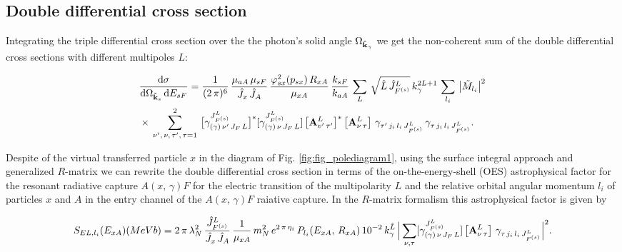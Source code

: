 \documentclass[prl,unsortedaddress,groupedaddress,twocolumn,amsmath,amsfonts,amssymb,showpacs,floatfix,nofootinbib]{revtex4}
\begin{document}
\subsection{Double differential cross section}
Integrating the triple differential cross section over the the photon's solid angle ${\Omega}_{{\rm {\bf {\hat k}}}_{\gamma}}$ we get the non-coherent sum of the double differential cross sections with different multipoles $L$:
\begin{widetext}
\begin{align}
&\frac{ {\rm d}\sigma}{  {\rm d}{\Omega}_{  {\rm{\bf {\hat k}}}_{s} }\, {\rm d}{E_{sF}} }=
 \frac{1}{(2\,\pi)^{6} }\,\frac{\mu_{aA}\,\mu_{sF}}{{\hat J}_{x}\,{\hat J}_{A}} \,\frac{\varphi_{sx}^{2}(p_{sx})\,R_{xA}}{\mu_{xA}}\,\frac{ k_{sF}}{k_{aA}}\,
 \sum\limits_{L}\,\sqrt{{\hat L}\,{\hat J}_{F^{(s)}}^{L}}\,k_{\gamma}^{2L+1}\,\sum\limits_{l_{i}}\,\big| {\tilde M}_{l_{i}}\big|^{2}                                  \nonumber\\
& \times\,\sum\limits_{\nu', \,\nu,\,\tau',\, \tau=1}^{2}\,\big[\gamma_{ (\gamma)\,\nu'\,J_{F}\,L}^{J_{F^{(s)}}^{L}}  \big]^{*} [\gamma_{(\gamma)\,\nu\,J_{F}\,L}^{J_{F^{(s)}}^{L}} ]\,\big[{\bf A}_{v'\,\tau'}^{L} \big]^{*}\,\big[{\bf A}_{\nu\,\tau}^{L} \big]\ \gamma_{\tau'\,j_{i}\,l_{i}\,J_{F^{(s)}}^{L}}\,\gamma_{\tau\,j_{i}\,l_{i}\,J_{F^{(s)}}^{L}}.
\label{doublediffcrsect11}
\end{align}
\end{widetext}
Despite of the virtual transferred particle $x$ in the diagram of Fig. \ref{fig:fig_polediagram1}, using the surface integral approach and generalized $R$-matrix we can rewrite the double differential cross section in terms of the 
on-the-energy-shell (OES) astrophysical factor for the resonant radiative capture $A(x,\,\gamma)F$ for the electric transition of the multipolarity $L$ and the relative orbital angular momentum $l_{i}$ of particles $x$ and $A$ in the entry channel of the $A(x,\,\gamma)F$ raiative capture. In the $R$-matrix formalism this astrophysical factor is given by
\begin{widetext}
\begin{align}
S_{EL,l_{i}}(E_{xA}) (MeVb) = 2\,\pi\,\lambda_{N}^{2}\,\frac{{\hat J}_{F^{(s)}}^{L}}{{\hat J}_{x}\,{\hat J}_{A}}\,\frac{1}{\mu_{xA}}\,m_{N}^{2}\,
e^{2\,\pi\,\eta_{i}}\,P_{l_{i}}(E_{xA},\,R_{xA})\,10^{-2}\,k_{\gamma}^{{\hat L}}\,\Big|\sum\limits_{\nu,\tau}[\gamma_{(\gamma)\,\nu\,J_{F}\,L}^{J_{F^{(s)}}^{L}} ]\,\big[{\bf A}_{\nu\,\tau}^{L} \big]\ \gamma_{\tau\,j_{i}\,l_{i}\,J_{F^{(s)}}^{L}}\Big|^{2}.
 \label{Sfactor1}
\end{align}   
\end{widetext}
\end{document}
